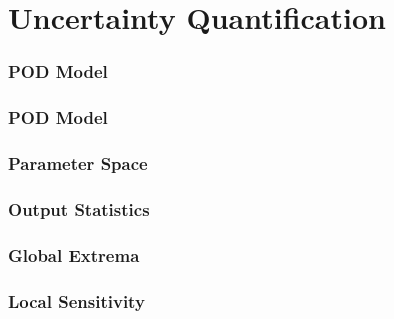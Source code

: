 \documentclass[9pt]{beamer}
\begin{document}
\section{Uncertainty Quantification}
\label{sec-4}
\begin{frame}
\frametitle{POD Model}
\label{sec-4-1}
\end{frame}
\begin{frame}
\frametitle{POD Model}
\label{sec-4-2}
\end{frame}
\begin{frame}
\frametitle{Parameter Space}
\label{sec-4-3}
\end{frame}
\begin{frame}
\frametitle{Output Statistics}
\label{sec-4-4}
\end{frame}
\begin{frame}
\frametitle{Global Extrema}
\label{sec-4-5}
\end{frame}
\begin{frame}
\frametitle{Local Sensitivity}
\label{sec-4-6}
\end{frame}
\end{document}
